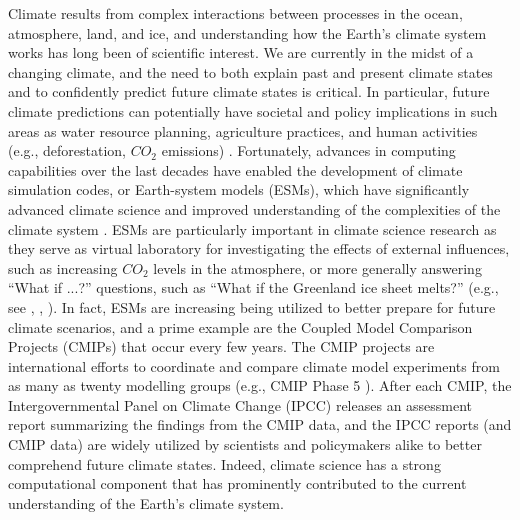 Climate results from complex interactions between processes in the ocean, atmosphere, land, and ice, and understanding how the Earth's climate system works has long been of scientific interest.  We are currently in the midst of a changing climate, and the need to both explain past and present climate states and to confidently predict future climate states is critical.  In particular, future climate predictions can potentially have societal and policy implications in such areas as water resource planning, agriculture practices, and human activities (e.g., deforestation, $CO_2$ emissions) \cite{washington2005}. Fortunately, advances in computing capabilities over the last decades have enabled the development of climate simulation codes, or Earth-system models (ESMs), which have significantly advanced climate science and improved understanding of the complexities of the climate system \cite{washington2009}.  ESMs are particularly important in climate science research as they serve as virtual laboratory for investigating the effects of external influences, such as increasing $CO_2$ levels in the atmosphere, or more generally answering ``What if ...?'' questions, such as ``What if the Greenland ice sheet melts?'' (e.g., see \cite{heavens2013}, \cite{zeebe2011}, \cite{easterbrook2009}).  In fact, ESMs are increasing being utilized to better prepare for future climate scenarios, and a prime example are the Coupled Model Comparison Projects (CMIPs) that occur every few years.  The CMIP projects 
are international efforts to coordinate and compare climate model experiments from as many as twenty modelling groups (e.g., CMIP Phase 5 \citep{cmip5}).  After each CMIP, the Intergovernmental Panel on Climate Change (IPCC) \cite{ipcc-web} releases an assessment report summarizing the findings from the CMIP data, and the IPCC reports (and CMIP data)
are widely utilized by scientists and policymakers alike to better comprehend future climate states. Indeed, climate science has a strong computational component that has prominently contributed to the current understanding of the Earth's climate system.


